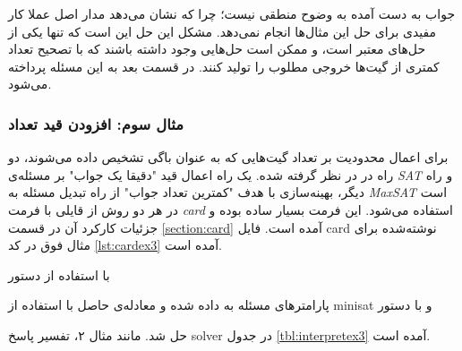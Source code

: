 \documentclass{article}
\begin{document}
جواب به دست آمده به وضوح منطقی نیست؛ چرا که نشان می‌دهد مدار اصل عملا کار مفیدی برای حل این مثال‌ها انجام نمی‌دهد. مشکل این حل این است که تنها یکی از حل‌های معتبر است، و ممکن است حل‌هایی وجود داشته باشند که با تصحیح تعداد کمتری از گیت‌ها خروجی مطلوب را تولید کنند. در قسمت بعد به این مسئله پرداخته می‌شود. 

\subsubsection{مثال سوم: افزودن قید تعداد}

برای اعمال محدودیت بر تعداد گیت‌هایی که به عنوان باگی تشخیص داده می‌شوند، دو راه در   در نظر گرفته شده. یک راه اعمال قید "دقیقا یک جواب" بر مسئله‌ی \textit{SAT} و راه دیگر، بهینه‌سازی با هدف "کمترین تعداد جواب" از راه تبدیل مسئله به \textit{MaxSAT} است در هر دو روش از قایلی با فرمت \textit{card} استفاده می‌شود. این فرمت بسیار ساده بوده و جزئیات کارکرد آن در قسمت \ref{section:card} آمده است. فایل card نوشته‌شده برای مثال فوق در کد \ref{lst:cardex3} آمده است. 

\begin{LTR}{}\end{LTR}

با استفاده از دستور 

\begin{flushleft}
\end{flushleft}

پارامترهای مسئله به  داده شده و معادله‌ی حاصل با استفاده از minisat و با دستور 

\begin{flushleft}
\end{flushleft}

حل شد. مانند مثال ۲، تفسیر پاسخ solver در جدول \ref{tbl:interpretex3} آمده است. 
\end{document}
